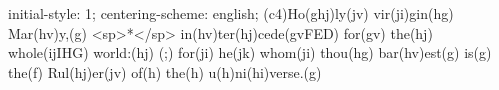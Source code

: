 initial-style: 1;
centering-scheme: english;
(c4)Ho(ghj)ly(jv) vir(ji)gin(hg) Mar(hv)y,(g) <sp>*</sp> in(hv)ter(hj)cede(gvFED) for(gv) the(hj) whole(ijIHG) world:(hj) (;) for(ji) he(jk) whom(ji) thou(hg) bar(hv)est(g) is(g) the(f) Rul(hj)er(jv) of(h) the(h) u(h)ni(hi)verse.(g)
